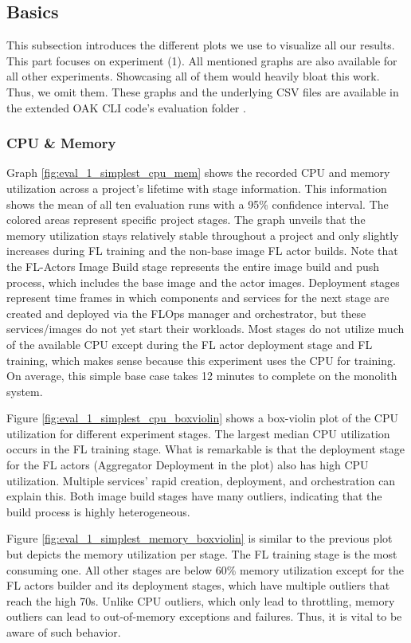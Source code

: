 \subsection{Basics} \label{subsection:eval_basics}

This subsection introduces the different plots we use to visualize all our results.
This part focuses on experiment (1).
All mentioned graphs are also available for all other experiments.
Showcasing all of them would heavily bloat this work.
Thus, we omit them.
These graphs and the underlying CSV files are available in the extended OAK CLI code's evaluation folder \cite{cli_code}.

\subsubsection{CPU \& Memory}

Graph \ref{fig:eval_1_simplest_cpu_mem} shows the recorded CPU and memory utilization across a project's lifetime with stage information.
This information shows the mean of all ten evaluation runs with a 95\% confidence interval.
The colored areas represent specific project stages.
The graph unveils that the memory utilization stays relatively stable throughout a project and only slightly increases during FL training and the non-base image FL actor builds.
Note that the FL-Actors Image Build stage represents the entire image build and push process, which includes the base image and the actor images.
Deployment stages represent time frames in which components and services for the next stage are created and deployed via the FLOps manager and orchestrator, but these services/images do not yet start their workloads.
Most stages do not utilize much of the available CPU except during the FL actor deployment stage and FL training, which makes sense because this experiment uses the CPU for training.
On average, this simple base case takes 12 minutes to complete on the monolith system.

Figure \ref{fig:eval_1_simplest_cpu_boxviolin} shows a box-violin plot of the CPU utilization for different experiment stages.
The largest median CPU utilization occurs in the FL training stage.
What is remarkable is that the deployment stage for the FL actors (Aggregator Deployment in the plot) also has high CPU utilization.
Multiple services' rapid creation, deployment, and orchestration can explain this.
Both image build stages have many outliers, indicating that the build process is highly heterogeneous.

Figure \ref{fig:eval_1_simplest_memory_boxviolin} is similar to the previous plot but depicts the memory utilization per stage.
The FL training stage is the most consuming one.
All other stages are below 60\% memory utilization except for the FL actors builder and its deployment stages, which have multiple outliers that reach the high 70s.
Unlike CPU outliers, which only lead to throttling, memory outliers can lead to out-of-memory exceptions and failures.
Thus, it is vital to be aware of such behavior.

